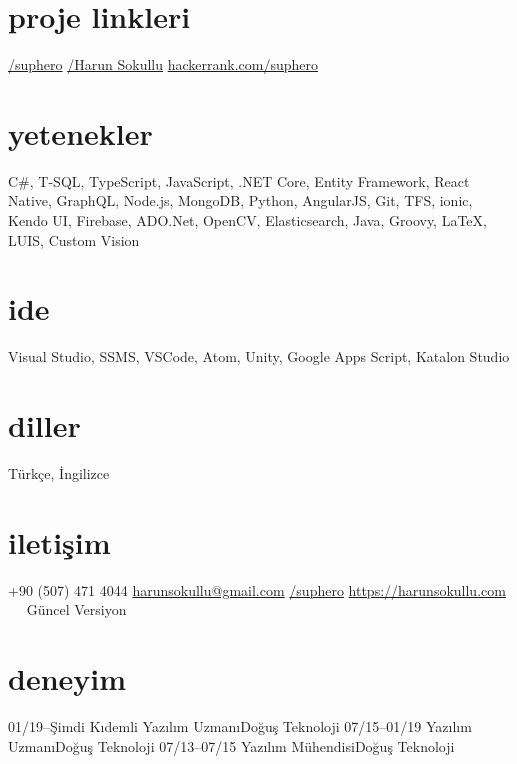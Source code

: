 \documentclass[]{../friggeri-cv} %
\begin{document}

\begin{aside}
\section{proje linkleri}
\href{https://github.com/suphero}{\faGithub/suphero}
\href{https://play.google.com/store/apps/developer?id=Harun+Sokullu}{\faAndroid/Harun Sokullu}
\href{https://www.hackerrank.com/suphero}{hackerrank.com/suphero}
\section{yetenekler}
C\#, T-SQL, TypeScript, JavaScript, .NET Core, Entity Framework, React Native, GraphQL, Node.js, MongoDB, Python, AngularJS, Git, TFS, ionic, Kendo UI, Firebase, ADO.Net, OpenCV, Elasticsearch, Java, Groovy, \LaTeX, LUIS, Custom Vision
\section{ide}
Visual Studio, SSMS, VSCode, Atom, Unity, Google Apps Script, Katalon Studio
\section{diller}
Türkçe, İngilizce
\section{iletişim}
+90 (507) 471 4044
\href{mailto:harunsokullu@gmail.com}{harunsokullu@gmail.com}
\href{https://www.linkedin.com/in/suphero}{\faLinkedin/suphero}
\href{https://harunsokullu.com}{https://harunsokullu.com}
~~
Güncel Versiyon
\end{aside}

\section{deneyim}

\begin{entrylist}

\entry
{01/19--Şimdi}
{Kıdemli Yazılım Uzmanı}{Doğuş Teknoloji}{}
\entry
{07/15--01/19}
{Yazılım Uzmanı}{Doğuş Teknoloji}{}
\entry
{07/13--07/15}
{Yazılım Mühendisi}{Doğuş Teknoloji}{}

\end{entrylist}
\end{document}
